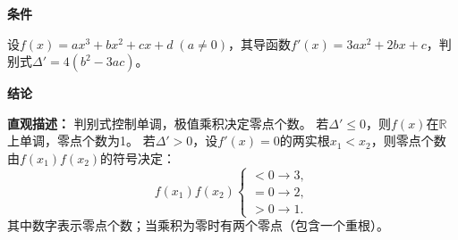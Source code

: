 \begin{statementbox}
	\textbf{\textcolor{CStatement}{条件}}
	\begin{description}[style=nextline, leftmargin=2.8em, labelsep=0.5em, itemsep=0.35em]
		\item[\textbf{\textcolor{CStatement}{条件1（函数与导数形式）：}}]
			设\(f(x)=ax^3+bx^2+cx+d\;(a\neq0)\)，其导函数\(f'(x)=3ax^2+2bx+c\)，判别式\(\Delta'=4(b^2-3ac)\)。
	\end{description}
	\textbf{\textcolor{CStatement}{结论}}
	\begin{description}[style=nextline, leftmargin=2.8em, labelsep=0.5em, itemsep=0.45em]
		\item[\textbf{\textcolor{CStatement}{结论一（零点个数分类判定）：}}]
			\textbf{\textcolor{CStatement}{直观描述：}}
			判别式控制单调，极值乘积决定零点个数。 若\(\Delta'\leq0\)，则\(f(x)\)在\(\mathbb{R}\)上单调，零点个数为1。 若\(\Delta'>0\)，设\(f'(x)=0\)的两实根\(x_1<x_2\)，则零点个数由\(f(x_1)f(x_2)\)的符号决定：
			\[
				f(x_1)f(x_2)
				\begin{cases}
					<0 \rightarrow 3,\\ =0 \rightarrow 2,\\ >0 \rightarrow 1.
			\end{cases}
			\]
			其中数字表示零点个数；当乘积为零时有两个零点（包含一个重根）。
	\end{description}

\end{statementbox}
